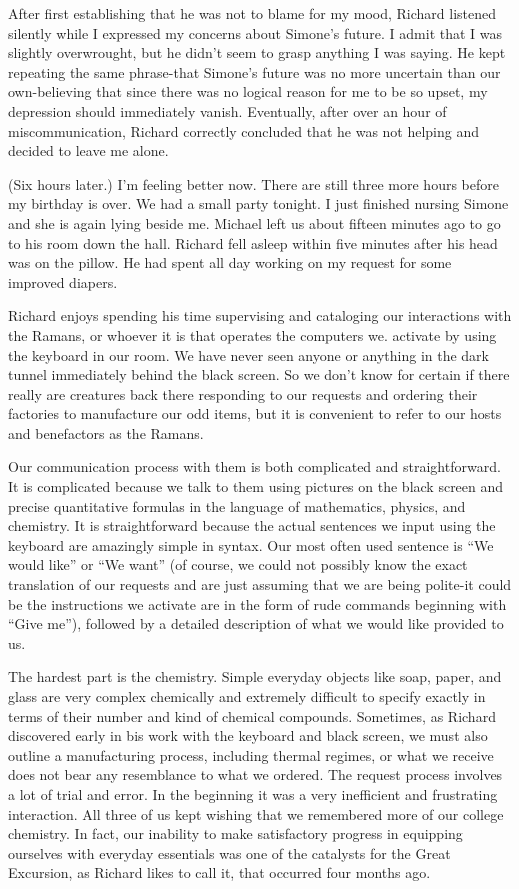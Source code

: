 \documentclass[]{article}
\begin{document}
After first establishing that he was not to blame for my mood, Richard listened silently while I expressed my concerns about Simone’s future.  I admit that I was slightly overwrought, but he didn’t seem to grasp anything I was saying.  He kept repeating the same phrase-that Simone’s future was no more uncertain than our own-believing that since there was no logical reason for me to be so upset, my depression should immediately vanish.  Eventually, after over an hour of miscommunication, Richard correctly concluded that he was not helping and decided to leave me alone.

(Six hours later.) I’m feeling better now.  There are still three more hours before my birthday is over.  We had a small party tonight.  I just finished nursing Simone and she is again lying beside me.  Michael left us about fifteen minutes ago to go to his room down the hall.  Richard fell asleep within five minutes after his head was on the pillow.  He had spent all day working on my request for some improved diapers.

Richard enjoys spending his time supervising and cataloging our interactions with the Ramans, or whoever it is that operates the computers we.  activate by using the keyboard in our room.  We have never seen anyone or anything in the dark tunnel immediately behind the black screen.  So we don’t know for certain if there really are creatures back there responding to our requests and ordering their factories to manufacture our odd items, but it is convenient to refer to our hosts and benefactors as the Ramans.

Our communication process with them is both complicated and straightforward.  It is complicated because we talk to them using pictures on the black screen and precise quantitative formulas in the language of mathematics, physics, and chemistry.  It is straightforward because the actual sentences we input using the keyboard are amazingly simple in syntax.  Our most often used sentence is “We would like” or “We want” (of course, we could not possibly know the exact translation of our requests and are just assuming that we are being polite-it could be the instructions we activate are in the form of rude commands beginning with “Give me”), followed by a detailed description of what we would like provided to us.

The hardest part is the chemistry.  Simple everyday objects like soap, paper, and glass are very complex chemically and extremely difficult to specify exactly in terms of their number and kind of chemical compounds.  Sometimes, as Richard discovered early in bis work with the keyboard and black screen, we must also outline a manufacturing process, including thermal regimes, or what we receive does not bear any resemblance to what we ordered.  The request process involves a lot of trial and error.  In the beginning it was a very inefficient and frustrating interaction.  All three of us kept wishing that we remembered more of our college chemistry.  In fact, our inability to make satisfactory progress in equipping ourselves with everyday essentials was one of the catalysts for the Great Excursion, as Richard likes to call it, that occurred four months ago.
\end{document}
